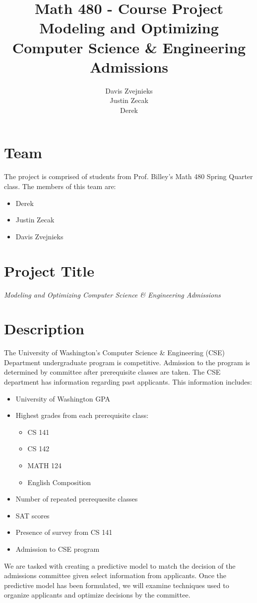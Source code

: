 \documentclass[11pt]{article}
\title{\textbf{Math 480 - Course Project}
			  \\Modeling and Optimizing
			  \\Computer Science \& Engineering Admissions}
\author{Davis Zvejnieks\\
		Justin Zecak\\
		Derek}
\date{}
\begin{document}
\maketitle

\section{Team}
The project is comprised of students from Prof. Billey's Math 480 Spring Quarter class. The members of this team are:

\begin{itemize}[noitemsep,leftmargin=1in]
\item Derek
\item Justin Zecak
\item Davis Zvejnieks
\end{itemize}



\section{Project Title}
\begin{center}
	\emph{Modeling and Optimizing Computer Science \& Engineering Admissions}
\end{center}


\section{Description}
The University of Washington's Computer Science \& Engineering (CSE) Department undergraduate program is competitive. Admission to the program is determined by committee after prerequisite classes are taken. The CSE department has information regarding past applicants. This information includes:\\
\begin{itemize}[noitemsep, leftmargin=1in]
\item University of Washington GPA
\item Highest grades from each prerequisite class:
	\begin{itemize}
	\item CS 141
	\item CS 142
	\item MATH 124
	\item English Composition
	\end{itemize}
\item Number of repeated prerequesite classes
\item SAT scores
\item Presence of survey from CS 141
\item Admission to CSE program
\end{itemize}
 We are tasked with creating a predictive model to match the decision of the admissions committee given select information from applicants. Once the predictive model has been formulated, we will examine techniques used to organize applicants and optimize decisions by the committee.
\end{document}
